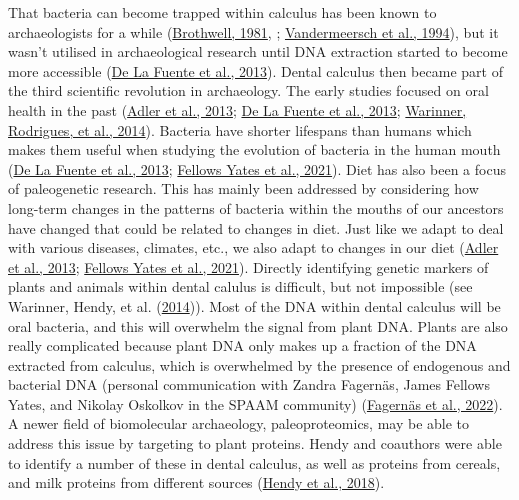 \documentclass[
  letterpaper,
]{book}
\begin{document}
That bacteria can become trapped within calculus has been known to
archaeologists for a while
(\protect\hyperlink{ref-brothwellDiggingBones1981}{Brothwell, 1981}, ;
\protect\hyperlink{ref-vandermeerschMiddlePaleolithic1994}{Vandermeersch
et al., 1994}), but it wasn't utilised in archaeological research until
DNA extraction started to become more accessible
(\protect\hyperlink{ref-delafuenteDNAHuman2013}{De La Fuente et al.,
2013}). Dental calculus then became part of the third scientific
revolution in archaeology. The early studies focused on oral health in
the past (\protect\hyperlink{ref-adlerSequencingAncient2013}{Adler et
al., 2013}; \protect\hyperlink{ref-delafuenteDNAHuman2013}{De La Fuente
et al., 2013};
\protect\hyperlink{ref-warinnerPathogensHost2014}{Warinner, Rodrigues,
et al., 2014}). Bacteria have shorter lifespans than humans which makes
them useful when studying the evolution of bacteria in the human mouth
(\protect\hyperlink{ref-delafuenteDNAHuman2013}{De La Fuente et al.,
2013}; \protect\hyperlink{ref-yatesOralMicrobiome2021}{Fellows Yates et
al., 2021}). Diet has also been a focus of paleogenetic research. This
has mainly been addressed by considering how long-term changes in the
patterns of bacteria within the mouths of our ancestors have changed
that could be related to changes in diet. Just like we adapt to deal
with various diseases, climates, etc., we also adapt to changes in our
diet (\protect\hyperlink{ref-adlerSequencingAncient2013}{Adler et al.,
2013}; \protect\hyperlink{ref-yatesOralMicrobiome2021}{Fellows Yates et
al., 2021}). Directly identifying genetic markers of plants and animals
within dental calulus is difficult, but not impossible (see Warinner,
Hendy, et al. (\protect\hyperlink{ref-warinnerEvidenceMilk2014}{2014})).
Most of the DNA within dental calculus will be oral bacteria, and this
will overwhelm the signal from plant DNA. Plants are also really
complicated because plant DNA only makes up a fraction of the DNA
extracted from calculus, which is overwhelmed by the presence of
endogenous and bacterial DNA (personal communication with Zandra
Fagernäs, James Fellows Yates, and Nikolay Oskolkov in the SPAAM
community)
(\protect\hyperlink{ref-fagernasMicrobialBiogeography2022}{Fagernäs et
al., 2022}). A newer field of biomolecular archaeology, paleoproteomics,
may be able to address this issue by targeting to plant proteins. Hendy
and coauthors were able to identify a number of these in dental
calculus, as well as proteins from cereals, and milk proteins from
different sources
(\protect\hyperlink{ref-hendyProteomicCalculus2018}{Hendy et al.,
2018}).
\end{document}
